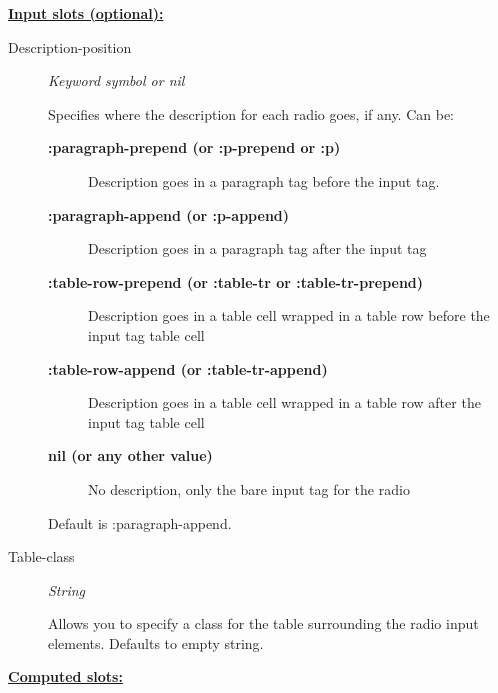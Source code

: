 \documentclass [11pt]{book}
\begin{document}
\begin{itemize}
\textbf{
\underline{Input slots (optional):}}

\begin{description}

\item [Description-position]
\emph{Keyword symbol or nil}

 Specifies where the description for each radio goes, if any.
Can be:


\begin{description}


\item[
\textbf{:paragraph-prepend (or :p-prepend or :p)}]

Description goes in a paragraph tag before the input tag.


\item[
\textbf{:paragraph-append (or :p-append)}]

Description goes in a paragraph tag after the input tag


\item[
\textbf{:table-row-prepend (or :table-tr or :table-tr-prepend)}]

Description goes in a table cell wrapped in a table row before the input tag table cell


\item[
\textbf{:table-row-append (or :table-tr-append)}]

Description goes in a table cell wrapped in a table row after the input tag table cell


\item[
\textbf{nil (or any other value)}]

No description, only the bare input tag for the radio

\end{description}


Default is :paragraph-append.




\item [Table-class]
\emph{String}

 Allows you to specify a class for the table surrounding the radio input elements. Defaults to empty string.




\end{description}






\textbf{
\underline{Computed slots:}}


\end{itemize}
\end{document}
